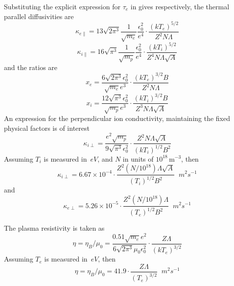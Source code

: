 Substituting the explicit expression for $\tau_e$ in  gives
respectively, the thermal parallel diffusivities are
\begin{equation}\label{eq:kappae}
\kappa_{e\|}= 13 \sqrt{2\pi^3} \frac{1}{\sqrt{m_e}}\frac{\epsilon_0^2}{e^4} \cdot
\frac{(kT_e)^{5/2}}{Z^2 N\Lambda}
\end{equation}
\begin{equation}\label{eq:kappai}
\kappa_{i\|}= 16 \sqrt{\pi^3} \frac{1}{\sqrt{m_p}}\frac{\epsilon_0^2}{e^4} \cdot
\frac{(kT_i)^{5/2}}{Z^4 N\Lambda \sqrt{A}}
\end{equation}
and the ratios are
\begin{equation}\label{eq:xee}
x_e=\frac {6 \sqrt{2\pi^3}\epsilon_0^2} {\sqrt{m_e}e^3} \cdot
\frac {(kT_e)^{3/2}B} {Z^2 N\Lambda}
\end{equation}
\begin{equation}\label{eq:xie}
x_i=\frac {12 \sqrt{\pi^3}\epsilon_0^2} {\sqrt{m_p}e^3} \cdot
\frac{(kT_i)^{3/2}B} {Z^3 N\Lambda \sqrt{A}}
\end{equation}
An expression for the perpendicular ion conductivity, maintaining
the fixed physical factors is of interest
\begin{equation}\label{eq:kperpie}
\kappa_{i\perp}=\frac{e^2\sqrt{m_p}}{9 \sqrt{\pi^3}\epsilon_0^2} \cdot
\frac{Z^2 N\Lambda \sqrt{A}}{(kT_i)^{1/2}B^2}
\end{equation}
Assuming $T_i$ is measured in~$eV$, and $N$ in units of $10^{18}$\,m$^{-3}$, then
\begin{equation}\label{eq:kperpin}
\kappa_{i\perp}=6.67 \times 10^{-4} \cdot
\frac{Z^2 (N/10^{18}) \Lambda \sqrt{A}}{(T_i)^{1/2}B^2}\;\;m^2 s^{-1}
\end{equation}
and
\begin{equation}\label{eq:kperpen}
\kappa_{e\perp}=5.26 \times 10^{-5} \cdot
\frac{Z^2 (N/10^{18}) \Lambda}{(T_e)^{1/2}B^2}\;\;m^2 s^{-1}
\end{equation}

The plasma resistivity is taken as
\begin{equation}\label{eq:resis}
\eta=\eta_B/\mu_0 =\frac{0.51\sqrt{m_e}e^2}{6 \sqrt{2\pi^3}\mu_0\epsilon_0^2} \cdot
\frac{Z \Lambda}{(kT_e)^{3/2}}
\end{equation}
Assuming $T_e$ is measured in~$eV$, then
\begin{equation}\label{eq:resisn}
\eta=\eta_B/\mu_0 =41.9\cdot\frac{Z \Lambda}{(T_e)^{3/2}}\;\;m^2 s^{-1}
\end{equation}


